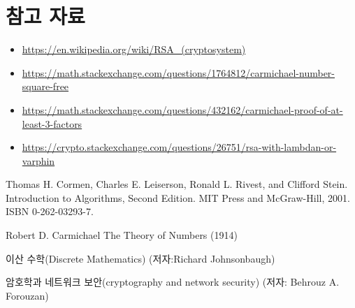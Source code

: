 

\section*{참고 자료}
\begin{itemize}
    \item \url{https://en.wikipedia.org/wiki/RSA_(cryptosystem)}

    \item \url{https://math.stackexchange.com/questions/1764812/carmichael-number-square-free}
    
    \item \url{https://math.stackexchange.com/questions/432162/carmichael-proof-of-at-least-3-factors}
    \item \url{https://crypto.stackexchange.com/questions/26751/rsa-with-lambdan-or-varphin}
\end{itemize}


\begin{thebibliography}{}

    
    Thomas H. Cormen, Charles E. Leiserson, Ronald L. Rivest, and Clifford Stein. Introduction to Algorithms, Second Edition. MIT Press and McGraw-Hill, 2001. ISBN 0-262-03293-7.
    
    Robert D. Carmichael The Theory of Numbers (1914) 


     이산 수학(Discrete Mathematics) (저자:Richard Johnsonbaugh)

     암호학과 네트워크 보안(cryptography and network security) (저자: Behrouz A. Forouzan)


\end{thebibliography}
